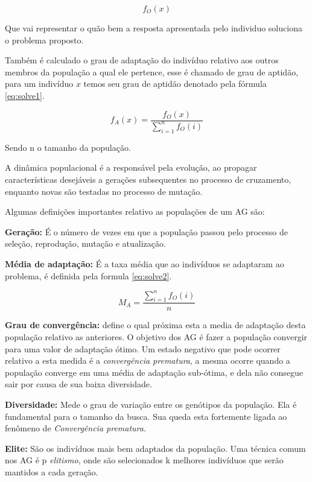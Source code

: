 \begin{equation} \label{eq:solve0}
f_O(x)  
\end{equation}


Que vai representar o quão bem a resposta apresentada pelo individuo soluciona o problema proposto.

Também é calculado o grau de adaptação do indivíduo relativo aos outros membros da população a qual ele pertence, esse é chamado de grau de aptidão, para um indivíduo $x$ temos seu grau de aptidão denotado pela fórmula \ref{eq:solve1}.


\begin{equation} \label{eq:solve1}
	f_A(x) = \frac{f_O(x)}{ \sum_{i=1}^{n}  f_O(i)  }  
\end{equation}


 Sendo n o tamanho da população.
 
 A dinâmica populacional é a responsável pela evolução, ao propagar características desejáveis a gerações subsequentes no processo de cruzamento, enquanto novas são testadas no processo de mutação.
 
 Algumas definições importantes relativo as populações de um AG são:
 
 \textbf{Geração:} É o número de vezes em que a população passou pelo processo de seleção, reprodução, mutação e atualização.

\textbf{Média de adaptação:} É a taxa média que ao indivíduos se adaptaram ao problema, é definida pela formula \ref{eq:solve2}. 

\begin{equation} \label{eq:solve2}
M_A = \frac{ \sum_{i=1}^{n} f_O(i) }{n}
\end{equation}


\textbf{Grau de convergência:} define o qual próxima esta a media de adaptação desta população relativo as anteriores. O objetivo dos AG é fazer a população convergir para uma valor de adaptação ótimo.
Um estado negativo que pode ocorrer relativo a esta medida é a \textit{convergência prematura}, a mesma ocorre quando a população converge em uma média de adaptação sub-ótima, e dela não consegue sair por causa de sua baixa diversidade.

\textbf{Diversidade:} Mede o grau de variação entre os genótipos da população. Ela é fundamental para o tamanho da busca.
Sua queda esta fortemente ligada ao fenômeno de \textit{Convergência prematura}.

\textbf{Elite:} São os indivíduos mais bem adaptados da população. Uma técnica comum nos AG é p \textit{elitismo}, onde são selecionados k melhores indivíduos que serão mantidos a cada geração.

